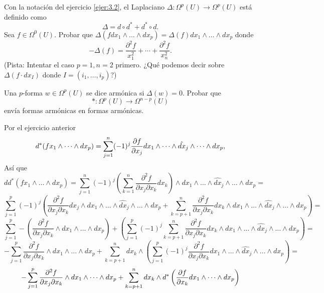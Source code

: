 \documentclass[twoside]{article}
\begin{document}
\begin{ejercicio}{3.3}
Con la notación del ejercicio \ref{ejer:3.2}, el Laplaciano $\Delta:\Omega^p(U)\to\Omega^p(U)$ está definido como
\[
\Delta=d\circ d^*+d^*\circ d.
\]
Sea $f\in\Omega^0(U)$. Probar que $\Delta(f dx_1\land\dots\land dx_p)=\Delta(f)dx_1\land\dots\land dx_p$ donde
\[
-\Delta(f)=\frac{\partial^2 f}{x_1^2}+\cdots+\frac{\partial^2 f}{x_n^2}.
\]
(Pista: Intentar el caso $p=1,n=2$ primero. ¿Qué podemos decir sobre $\Delta(f\cdot dx_I)$ donde $I=(i_1,\dots, i_p)$?)

Una $p$-forma $w\in\Omega^p(U)$ se dice armónica si $\Delta(w)=0$. Probar que
\[
*:\Omega^p(U)\to \Omega^{n-p}(U)
\]
envía formas armónicas en formas armónicas.
\end{ejercicio}
\begin{solucion}
Por el ejercicio anterior
\[
d^*(fx_1\land\dots\land dx_p)=\sum_{j=1}^n(-1)^j\frac{\partial f}{\partial x_j}dx_1\land\dots\land\hat{dx}_j\land\dots\land dx_p,
\]
Así que
\[
dd^*(fx_1\land\dots\land dx_p)=\sum_{j=1}^n(-1)^j\left(\sum_{k=1}^n\frac{\partial^2 f}{\partial x_j\partial x_k}dx_k\right)\land dx_1\land\dots\land\hat{dx}_j\land\dots\land dx_p=
\]
\[
\sum
_{j=1}^p(-1)^j\left(\frac{\partial^2 f}{\partial x_j\partial x_k}dx_j\land dx_1\land\dots\land\hat{dx}_j\land\dots\land dx_p+\sum_{k=p+1}^n\frac{\partial^2 f}{\partial x_j\partial x_k}dx_k\land dx_1\land\dots\land\hat{dx}_j\land\dots\land dx_p\right)=
\]
\[
\sum
_{j=1}^p-\left(\frac{\partial^2 f}{\partial x_j\partial x_k}\land dx_1\land\dots\land dx_p\right)+\left(\sum_{j=1}^p(-1)^j\sum_{k=p+1}^n\frac{\partial^2 f}{\partial x_j\partial x_k}dx_k\land dx_1\land\dots\land\hat{dx}_j\land\dots\land dx_p\right)=
\]
\[
-\sum_{j=1}^p\frac{\partial^2 f}{\partial x_j\partial x_k}\land dx_1\land\dots\land dx_p+\sum_{k=p+1}^ndx_k\land\left(\sum_{j=1}^p(-1)^j\frac{\partial^2 f}{\partial x_j\partial x_k}dx_1\land\dots\land\hat{dx}_j\land\dots\land dx_p\right)=
\]
\[
-\sum_{j=1}^p\frac{\partial^2 f}{\partial x_j\partial x_k}\land dx_1\land\dots\land dx_p+\sum_{k=p+1}^ndx_k\land d^*\left(\frac{\partial f}{\partial x_k}dx_1\land\dots\land dx_p\right)
\]


\end{solucion}
\end{document}
